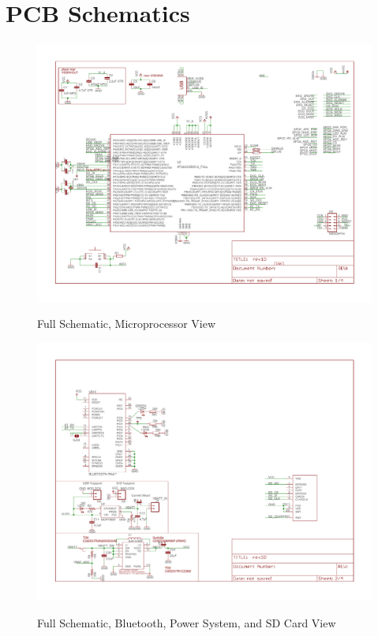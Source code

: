 \appendix
\renewcommand{\cftchappresnum}{Appendix }
\chapter{PCB Schematics}
\label{chap:PCB_Schematics}
\begin{figure}
	\begin{center}
		\label{fig:FullSchematic_Sheet1}
		\includegraphics[angle=90,scale=1,width=1\textwidth]{Images/rev1D_sheet1.pdf} 
		\caption{Full Schematic, Microprocessor View}
	\end{center}
\end{figure}

\begin{figure}
	\begin{center}
		\label{fig:FullSchematic_Sheet2}
		\includegraphics[angle=90,scale=1,width=1\textwidth]{Images/rev1D_sheet2.pdf} 
		\caption{Full Schematic, Bluetooth, Power System, and SD Card View}
	\end{center}
\end{figure}

